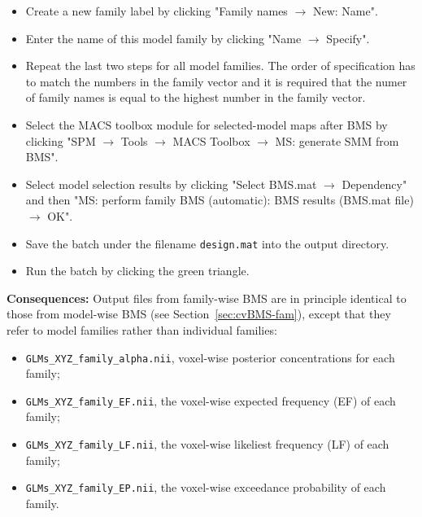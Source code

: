 \documentclass[a4paper,12pt]{article}
\newcommand{\ra}{$\rightarrow$ }
\begin{document}
\begin{itemize}
\item
Create a new family label by clicking "Family names \ra New: Name".

\item
Enter the name of this model family by clicking "Name \ra Specify".

\item
Repeat the last two steps for all model families. The order of specification has to match the numbers in the family vector and it is required that the numer of family names is equal to the highest number in the family vector.

\item
Select the MACS toolbox module for selected-model maps after BMS by clicking \linebreak[4] "SPM \ra Tools \ra MACS Toolbox \ra MS: generate SMM from BMS".

\item
Select model selection results by clicking "Select BMS.mat \ra Dependency" and then \linebreak[4] "MS: perform family BMS (automatic): BMS results (BMS.mat file) \ra OK".

\item
Save the batch under the filename \texttt{design.mat} into the output directory.

\item
Run the batch by clicking the green triangle.
	
\end{itemize}

\textbf{Consequences:} Output files from family-wise BMS are in principle identical to those from model-wise BMS (see Section~\ref{sec:cvBMS-fam}), except that they refer to model families rather than individual families:
\begin{itemize}
	
\item
\texttt{GLMs\_XYZ\_family\_alpha.nii}, voxel-wise posterior concentrations for each family;

\item
\texttt{GLMs\_XYZ\_family\_EF.nii}, the voxel-wise expected frequency (EF) of each family;

\item
\texttt{GLMs\_XYZ\_family\_LF.nii}, the voxel-wise likeliest frequency (LF) of each family;

\item
\texttt{GLMs\_XYZ\_family\_EP.nii}, the voxel-wise exceedance probability of each family.
	
\end{itemize}
\end{document}

